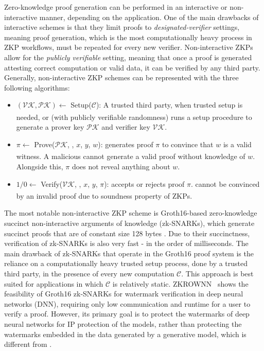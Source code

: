 
Zero-knowledge proof generation can be performed in an interactive or non-interactive manner, depending on the application. One of the main drawbacks of interactive schemes is that they limit proofs to \textit{designated-verifier} settings, meaning proof generation, which is the most computationally heavy process in ZKP workflows, must be repeated for every new verifier. Non-interactive ZKPs allow for the \textit{publicly verifiable} setting, meaning that once a proof is generated attesting correct computation or valid data, it can be verified by any third party. Generally, non-interactive ZKP schemes can be represented with the three following algorithms: 

\begin{itemize}
    \item $(\mathcal{VK, PK})\xleftarrow[]{}$ Setup($\mathcal{C}$): A trusted third party, when trusted setup is needed, or \Vrf (with publicly verifiable randomness) runs a setup procedure to generate a prover key $\mathcal{PK}$ and verifier key $\mathcal{VK}$.
    \item $\pi \xleftarrow[]{}$ Prove($\mathcal{PK}$, \Cir, $x$, $y$, $w$): \Prv generates proof $\pi$ to convince \Vrf that $w$ is a valid witness. A malicious \Prv cannot generate a valid proof without knowledge of $w$. Alongside this, $\pi$ does not reveal anything about $w$.
    \item $1/0 \xleftarrow[]{}$ Verify($\mathcal{VK}$, \Cir, $x$, $y$, $\pi$): \Vrf accepts or rejects proof $\pi$. \Vrf cannot be convinced by an invalid proof due to soundness property of ZKPs.
\end{itemize}

The most notable non-interactive ZKP scheme is Groth16-based zero-knowledge succinct non-interactive arguments of knowledge (zk-SNARKs), which generate succinct proofs that are of constant size 128 bytes \cite{groth2016size}. Due to their succinctness, verification of zk-SNARKs is also very fast - in the order of milliseconds. The main drawback of zk-SNARKs that operate in the Groth16 proof system is the reliance on a computationally heavy trusted setup process, done by a trusted third party, in the presence of every new computation $\mathcal{C}$. This approach is best suited for applications in which $\mathcal{C}$ is relatively static.
ZKROWNN~\cite{sheybani2023zkrownn} shows the feasibility of Groth16 zk-SNARKs for watermark verification in deep neural networks (DNN), requiring only low communication and runtime for a user to verify a proof. However, its primary goal is to protect the watermarks of deep neural networks for IP protection of the models, rather than protecting the watermarks embedded in the data generated by a generative model, which is different from \sys{}. 

